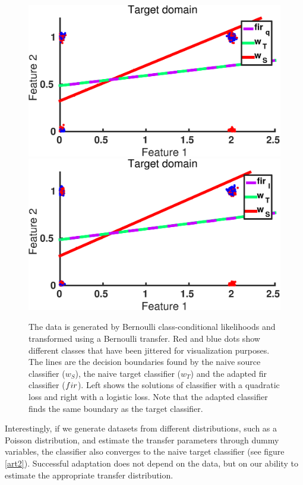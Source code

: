 \documentclass[twoside,11pt]{article}
\begin{document}
\begin{figure}[ht]
\centering
\includegraphics[width=.45\textwidth]{images/da_artexp_sens_model_convergence_Bern_square.eps} \hspace{5px}
\includegraphics[width=.45\textwidth]{images/da_artexp_sens_model_convergence_Bern_log.eps}
\caption{The data is generated by Bernoulli class-conditional likelihoods and transformed using a Bernoulli transfer. Red and blue dots show different classes that have been jittered for visualization purposes. The lines are the decision boundaries found by the naive source classifier ($w_{S}$), the naive target classifier ($w_{T}$) and the adapted {\sc fir} classifier (${\sc fir}$). Left shows the solutions of classifier with a quadratic loss and right with a logistic loss. Note that the adapted classifier finds the same boundary as the target classifier.}
\label{art1}
\end{figure}

Interestingly, if we generate datasets from different distributions, such as a Poisson distribution, and estimate the transfer parameters through dummy variables, the classifier also converges to the naive target classifier (see figure \ref{art2}). Successful adaptation does not depend on the data, but on our ability to estimate the appropriate transfer distribution. 
\end{document}
